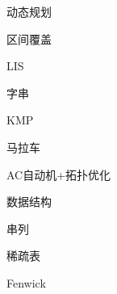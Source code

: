 \documentclass{article}
\begin{document}
\begin{enumerate}
\begin{itemize}
	\end{itemize}

{\bf \LARGE \item  动态规划}

	\begin{itemize}
	
	{\bf \item 区间覆盖}
		
	
	{\bf \item  LIS}
		
	
	
	\end{itemize}

{\bf \LARGE \item  字串}

	\begin{itemize}
	
	{\bf \item KMP}
		
	
	{\bf \item 马拉车}
		
	
	{\bf \item AC自动机+拓扑优化}
	
		
	
	\end{itemize}
	

{\bf \LARGE \item  数据结构}

	\begin{itemize}
	
	{\bf \item 串列}
		
	
	{\bf \item 稀疏表}
				
	
	{\bf \item Fenwick}
	
	
	\end{itemize}



\end{enumerate}
\end{document}
